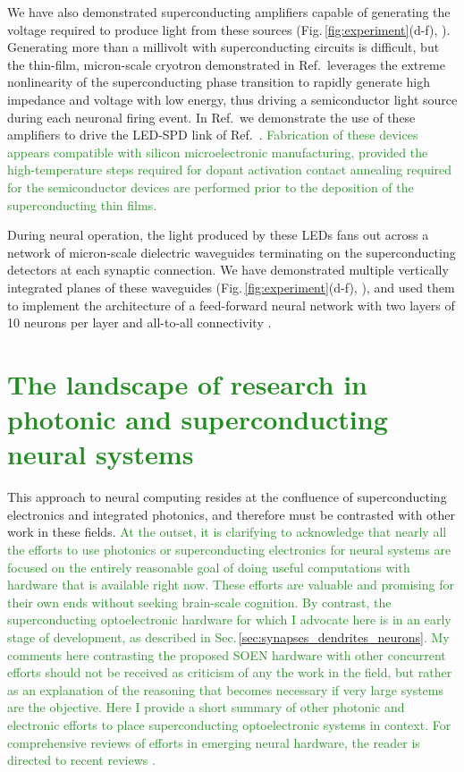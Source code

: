 \documentclass{article}
\newcommand{\onlinecite}[1]{\hspace{-1 ex} \nocite{#1}\citenum{#1}}
\begin{document}
\begin{multicols}{2}
We have also demonstrated superconducting amplifiers capable of generating the voltage required to produce light from these sources (Fig.\,\ref{fig:experiment}(d-f), \cite{mcve2019}). Generating more than a millivolt with superconducting circuits is difficult, but the thin-film, micron-scale cryotron demonstrated in Ref.\,\cite{mcve2019} leverages the extreme nonlinearity of the superconducting phase transition to rapidly generate high impedance and voltage with low energy, thus driving a semiconductor light source during each neuronal firing event. In Ref.\,\onlinecite{mcve2019} we demonstrate the use of these amplifiers to drive the LED-SPD link of Ref.\,\onlinecite{buch2017}. \textcolor{ForestGreen}{Fabrication of these devices appears compatible with silicon microelectronic manufacturing, provided the high-temperature steps required for dopant activation contact annealing required for the semiconductor devices are performed prior to the deposition of the superconducting thin films.}

During neural operation, the light produced by these LEDs fans out across a network of micron-scale dielectric waveguides terminating on the superconducting detectors at each synaptic connection. We have demonstrated multiple vertically integrated planes of these waveguides (Fig.\,\ref{fig:experiment}(d-f), \cite{chbu2017}), and used them to implement the architecture of a feed-forward neural network with two layers of 10 neurons per layer and all-to-all connectivity \cite{chbu2018}.

\section{\label{sec:other_approaches}\textcolor{ForestGreen}{The landscape of research in photonic and superconducting neural systems}}
This approach to neural computing resides at the confluence of superconducting electronics and integrated photonics, and therefore must be contrasted with other work in these fields. \textcolor{ForestGreen}{At the outset, it is clarifying to acknowledge that nearly all the efforts to use photonics or superconducting electronics for neural systems are focused on the entirely reasonable goal of doing useful computations with hardware that is available right now. These efforts are valuable and promising for their own ends without seeking brain-scale cognition. By contrast, the superconducting optoelectronic hardware for which I advocate here is in an early stage of development, as described in Sec.\,\ref{sec:synapses_dendrites_neurons}. My comments here contrasting the proposed SOEN hardware with other concurrent efforts should not be received as criticism of any the work in the field, but rather as an explanation of the reasoning that becomes necessary if very large systems are the objective. Here I provide a short summary of other photonic and electronic efforts to place superconducting optoelectronic systems in context. For comprehensive reviews of efforts in emerging neural hardware, the reader is directed to recent reviews \cite{bexi2020,shta2021}.}


\end{multicols}
\end{document}
